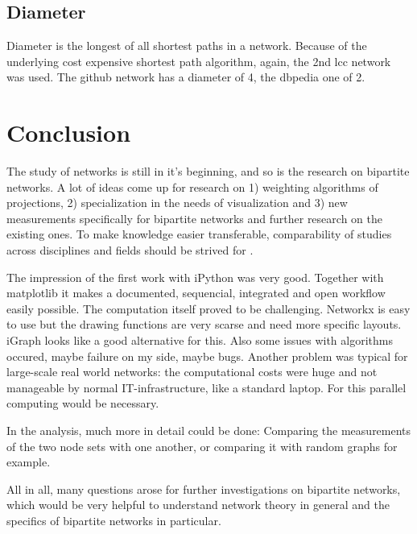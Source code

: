 \documentclass[
a4paper,     %
12pt         %
]{scrartcl}  %
\begin{document}
\subsection{Diameter}
\label{sub:diameter}

Diameter is the longest of all shortest paths in a network. Because of the underlying cost expensive shortest path algorithm, again, the 2nd lcc network was used. The github network has a diameter of 4, the dbpedia one of 2.


\section{Conclusion}
\label{sec:conclusio}

The study of networks is still in it's beginning, and so is the research on bipartite networks. A lot of ideas come up for research on 1) weighting algorithms of projections, 2) specialization in the needs of visualization \citep{schulz_visual_2008} and 3) new measurements specifically for bipartite networks and further research on the existing ones. To make knowledge easier transferable, comparability of studies across disciplines and fields should be strived for \citep{piepenbrink_methodological_2013}.

The impression of the first work with iPython was very good. Together with matplotlib it makes a documented, sequencial, integrated and open workflow easily possible. The computation itself proved to be challenging. Networkx is easy to use but the drawing functions are very scarse and need more specific layouts. iGraph looks like a good alternative for this. Also some issues with algorithms occured, maybe failure on my side, maybe bugs. Another problem was typical for large-scale real world networks: the computational costs were huge and not manageable by normal IT-infrastructure, like a standard laptop. For this parallel computing would be necessary.

In the analysis, much more in detail could be done: Comparing the measurements of the two node sets with one another, or comparing it with random graphs for example.

All in all, many questions arose for further investigations on bipartite networks, which would be very helpful to understand network theory in general and the specifics of bipartite networks in particular.

\end{document}
